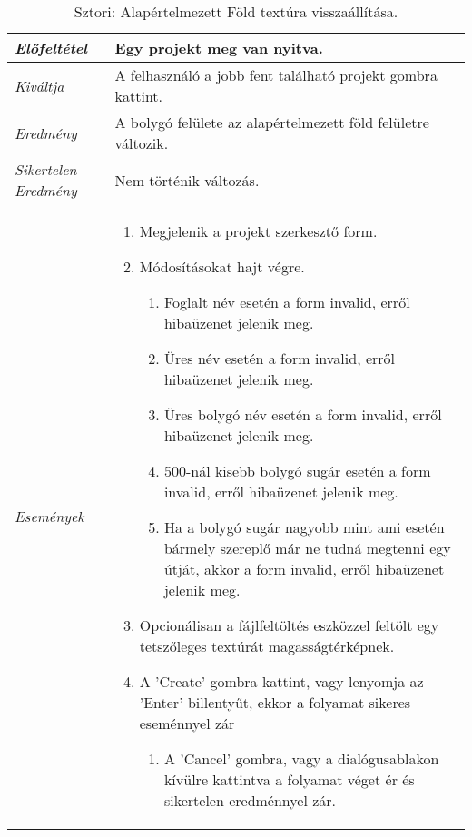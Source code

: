 \begin{table}[H]
	\centering
	\begin{tabular}{ | m{} | m{} | }
		\hline
		\emph{Előfeltétel} & Egy projekt meg van nyitva.  \\
		\hline
		\emph{Kiváltja} & A felhasználó a jobb fent található projekt gombra kattint. \\
		\hline
		\emph{Eredmény} & A bolygó felülete az alapértelmezett föld felületre változik. \\
		\hline
		\emph{Sikertelen Eredmény} & Nem történik változás.  \\
		\hline
		\hline
		\emph{Események} &

		\begin{enumerate}[itemsep=-1ex]
			\item Megjelenik a projekt szerkesztő form.
			\item Módosításokat hajt végre.
			\begin{enumerate}[itemsep=-1ex]
				\item Foglalt név esetén a form invalid, erről hibaüzenet jelenik meg.
				\item Üres név esetén a form invalid, erről hibaüzenet jelenik meg.
				\item Üres bolygó név esetén a form invalid, erről hibaüzenet jelenik meg.
				\item 500-nál kisebb bolygó sugár esetén a form invalid, erről hibaüzenet jelenik meg.
				\item Ha a bolygó sugár nagyobb mint ami esetén bármely szereplő már ne tudná megtenni egy útját, akkor a form invalid, erről hibaüzenet jelenik meg.
			\end{enumerate}
			\item Opcionálisan a fájlfeltöltés eszközzel feltölt egy tetszőleges textúrát magasságtérképnek.
			\item A 'Create' gombra kattint, vagy lenyomja az 'Enter' billentyűt, ekkor a folyamat sikeres eseménnyel zár
			\begin{enumerate}[itemsep=-1ex]
				\item A 'Cancel' gombra, vagy a dialógusablakon kívülre kattintva a folyamat véget ér és sikertelen eredménnyel zár.
			\end{enumerate}
		\end{enumerate}

		\\
		\hline
	\end{tabular}
	\caption{Sztori: Alapértelmezett Föld textúra visszaállítása.}
	\label{tab:story-project-edit-earth-texture}
\end{table}

